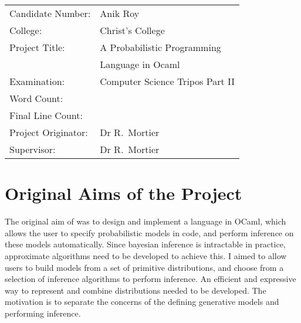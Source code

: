 \immediate{}
\immediate{}


{\large

\begin{tabular}{ll}
Candidate Number:   & Anik Roy                               \\
College:            & Christ's College                       \\
Project Title:      & A Probabilistic Programming            \\
                    & Language in Ocaml                      \\
Examination:        & Computer Science Tripos Part II        \\
Word Count:         & \footnotemark[1]  \\
Final Line Count:   & \footnotemark[2]  \\
Project Originator: & Dr R.~Mortier                          \\
Supervisor:         & Dr R.~Mortier                          \\ 
\end{tabular}
}


\section*{Original Aims of the Project}

The original aim of was to design and implement a language in OCaml, which allows the user to specify probabilistic models in code, and perform inference on these models automatically. Since bayesian inference is intractable in practice, approximate algorithms need to be developed to achieve this. I aimed to allow users to build models from a set of primitive distributions, and choose from a selection of inference algorithms to perform inference. An efficient and expressive way to represent and combine distributions needed to be developed. The motivation is to separate the concerns of the defining generative models and performing inference.

